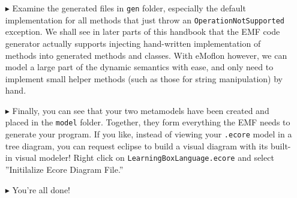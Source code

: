 \begin{itemize}
\item[$\blacktriangleright$] Examine the generated files in \texttt{gen} folder, especially the default implementation for all methods that just throw an
\texttt{OperationNotSupported} exception. We shall see in later parts of this handbook that the EMF code generator actually supports injecting hand-written
implementation of methods into generated methods and classes. With eMoflon however, we can model a large part of the dynamic semantics with ease, and only need
to implement small helper methods (such as those for string manipulation) by hand.

\item[$\blacktriangleright$] Finally, you can see that your two metamodels have been created and placed in the \texttt{model} folder. Together, they form
everything the EMF needs to generate your program. If you like, instead of viewing your \texttt{.ecore} model in a tree diagram, you can request eclipse to
build a visual diagram with its built-in visual modeler! Right click on \texttt{LearningBoxLanguage.ecore} and select ''Initilalize Ecore Diagram File.''


\item[$\blacktriangleright$] You're all done!

\end{itemize}